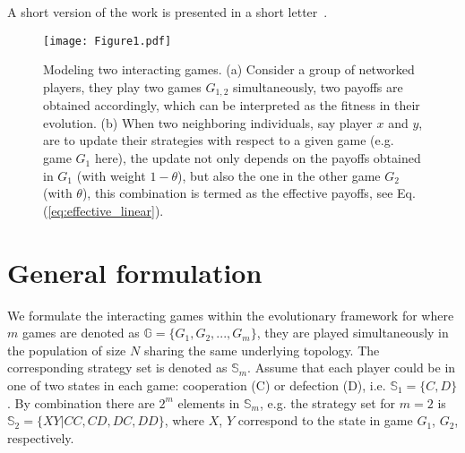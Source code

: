 \documentclass[showpacs,superscriptaddress,reprint,nofootinbib,amsmath,amssymb,aps,pre]{revtex4-1}
\begin{document}
A short version of the work is presented in a short letter~\cite{CSL}.

\begin{figure}
\centering
\texttt{[image: Figure1.pdf]}
\caption{
Modeling two interacting games.
(a) Consider a group of networked players, they play two games $G_{1,2}$ simultaneously, two payoffs are obtained accordingly, which can be interpreted as the fitness in their evolution.
(b) When two neighboring individuals, say player $x$ and $y$, are to update their strategies with respect to a given game (e.g.  game $G_1$ here), the update not only depends on the payoffs obtained in $G_1$ (with weight $1-\theta$), but also the one in the other game $G_2$ (with $\theta$), this combination is termed as the effective payoffs, see Eq.(\ref{eq:effective_linear}).
}
\label{fig:scheme}
\end{figure}

\section{General formulation}\label{sec:model}
We formulate the interacting games within the evolutionary framework for where $m$ games are denoted as $\mathbb{G}=\{G_1,G_2,...,G_m\}$, they are played simultaneously in the population of size $N$ sharing the same underlying topology. The corresponding strategy set is denoted as $\mathbb{S}_m$.  Assume that each player could be in one of two states in each game: cooperation (C) or defection (D), i.e. $\mathbb{S}_1=\{C,D\}$. By combination there are $2^{m}$ elements in $\mathbb{S}_m$, e.g. the strategy set for $m=2$ is $\mathbb{S}_2=\{XY|CC, CD, DC, DD\}$, where $X$, $Y$ correspond to the state in game $G_1$, $G_2$, respectively.
\end{document}
